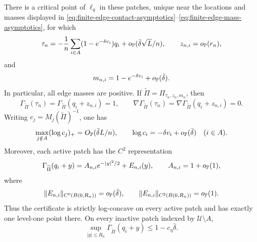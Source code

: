 \begin{lemma}
There is a critical point of \(\ell_q\) in these patches, unique near the
locations and masses displayed in
\eqref{eq:finite-edge-contact-asymptotics}--\eqref{eq:finite-edge-mass-asymptotics},
for which
\begin{equation}
\label{eq:finite-edge-contact-asymptotics}
 \tau_n
 =
 -\frac1n\sum_{i\in A}(1-e^{-\delta v_i})q_i
 +o_{\mathbb P}(\bar\delta\sqrt L/n),\qquad
 z_{n,i}=o_{\mathbb P}(r_n),
\end{equation}
and
\begin{equation}
\label{eq:finite-edge-mass-asymptotics}
 m_{n,i}=1-e^{-\delta v_i}+o_{\mathbb P}(\bar\delta).
\end{equation}
In particular, all edge masses are positive.  If
\(\widetilde\Pi=\Pi_{\tau_n,z_n,m_n}\), then
\[
 \Gamma_{\widetilde\Pi}(\tau_n)
 =\Gamma_{\widetilde\Pi}(q_i+z_{n,i})=1,\qquad
 \nabla\Gamma_{\widetilde\Pi}(\tau_n)
 =\nabla\Gamma_{\widetilde\Pi}(q_i+z_{n,i})=0.
\]
Writing \(c_j=M_j(\widetilde\Pi)^{-1}\), one has
\begin{equation}
\label{eq:finite-edge-denominator-profile}
 \max_{j\notin A}(\log c_j)_+
 =O_{\mathbb P}(\bar\delta L/n),\qquad
 \log c_i=-\delta v_i+o_{\mathbb P}(\bar\delta)\quad(i\in A).
\end{equation}
Moreover, each active patch has the \(C^2\) representation
\begin{equation}
\label{eq:finite-edge-certificate-c2}
 \Gamma_{\widetilde\Pi}(q_i+y)
 =
 A_{n,i}e^{-|y|^2/2}+E_{n,i}(y),\qquad
 A_{n,i}=1+o_{\mathbb P}(1),
\end{equation}
where
\[
 \|E_{n,i}\|_{C^0(B(0,R_n))}=o_{\mathbb P}(\bar\delta),
 \qquad
 \|E_{n,i}\|_{C^2(B(0,R_n))}=o_{\mathbb P}(1).
\]
Thus the certificate is strictly log-concave on every active patch and
has exactly one level-one point there.  On every inactive patch indexed
by \(\mathcal U\setminus A\),
\[
 \sup_{|y|\le R_n}\Gamma_{\widetilde\Pi}(q_i+y)
 \le1-c_\eta\bar\delta.
\]
\end{lemma}

